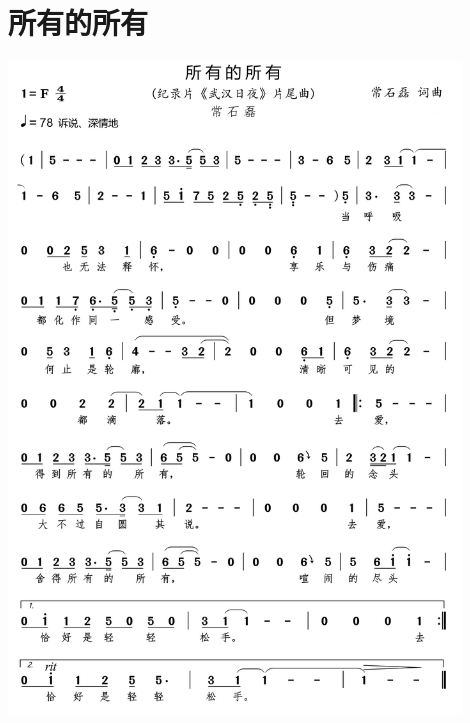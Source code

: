 \documentclass[cn,pad,twocol]{elegantbook}
\begin{document}
\section{所有的所有} \includegraphics[width=0.9\textwidth]{rpi400/20210206所有的所有.png}
\end{document}
